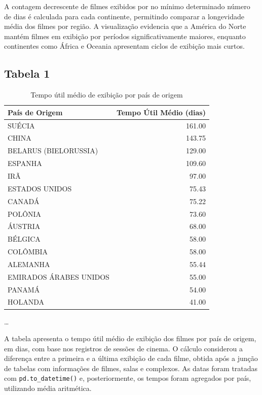 \documentclass{article}
\begin{document}
A contagem decrescente de filmes exibidos por no mínimo determinado número de dias é calculada para cada continente, permitindo comparar a longevidade média dos filmes por região. A visualização evidencia que a América do Norte mantém filmes em exibição por períodos significativamente maiores, enquanto continentes como África e Oceania apresentam ciclos de exibição mais curtos.


\subsection*{Tabela 1}

\begin{table}[H]
\centering
\caption{Tempo útil médio de exibição por país de origem\\}
\begin{small}
\begin{tabular}{l r}
\hline
\textbf{País de Origem} & \textbf{Tempo Útil Médio (dias)} \\
\hline
SUÉCIA & 161.00 \\
CHINA & 143.75 \\
BELARUS (BIELORUSSIA) & 129.00 \\
ESPANHA & 109.60 \\
IRÃ & 97.00 \\
ESTADOS UNIDOS & 75.43 \\
CANADÁ & 75.22 \\
POLÔNIA & 73.60 \\
ÁUSTRIA & 68.00 \\
BÉLGICA & 58.00 \\
COLÔMBIA & 58.00 \\
ALEMANHA & 55.44 \\
EMIRADOS ÁRABES UNIDOS & 55.00 \\
PANAMÁ & 54.00 \\
HOLANDA & 41.00 \\
\end{tabular}
\end{small}

\begin{center}
\small
\ldots
\end{center}

\end{table}
A tabela apresenta o tempo útil médio de exibição dos filmes por país de origem, em dias, com base nos registros de sessões de cinema. O cálculo considerou a diferença entre a primeira e a última exibição de cada filme, obtida após a junção de tabelas com informações de filmes, salas e complexos. As datas foram tratadas com \texttt{pd.to\_datetime()} e, posteriormente, os tempos foram agregados por país, utilizando média aritmética.
\end{document}
